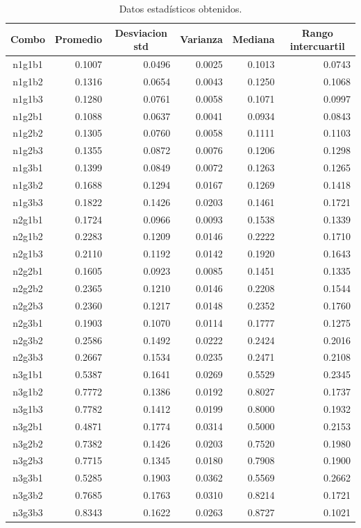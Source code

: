 \documentclass{article}
\begin{document}
\begin{table}[h!]
\centering
\caption{Datos estadísticos obtenidos.}
\label{tabla4}
\begin{tabular}{|c|r|r|r|r|r|}
\hline
\textbf{Combo} & \multicolumn{1}{c|}{\textbf{Promedio}} & \multicolumn{1}{c|}{\textbf{Desviacion std}} & \multicolumn{1}{c|}{\textbf{Varianza}} & \multicolumn{1}{c|}{\textbf{Mediana}} & \multicolumn{1}{c|}{\textbf{Rango intercuartil}} \\ \hline
n1g1b1 & 0.1007 & 0.0496 & 0.0025 & 0.1013 & 0.0743 \\ \hline
n1g1b2 & 0.1316 & 0.0654 & 0.0043 & 0.1250 & 0.1068 \\ \hline
n1g1b3 & 0.1280 & 0.0761 & 0.0058 & 0.1071 & 0.0997 \\ \hline
n1g2b1 & 0.1088 & 0.0637 & 0.0041 & 0.0934 & 0.0843 \\ \hline
n1g2b2 & 0.1305 & 0.0760 & 0.0058 & 0.1111 & 0.1103 \\ \hline
n1g2b3 & 0.1355 & 0.0872 & 0.0076 & 0.1206 & 0.1298 \\ \hline
n1g3b1 & 0.1399 & 0.0849 & 0.0072 & 0.1263 & 0.1265 \\ \hline
n1g3b2 & 0.1688 & 0.1294 & 0.0167 & 0.1269 & 0.1418 \\ \hline
n1g3b3 & 0.1822 & 0.1426 & 0.0203 & 0.1461 & 0.1721 \\ \hline
n2g1b1 & 0.1724 & 0.0966 & 0.0093 & 0.1538 & 0.1339 \\ \hline
n2g1b2 & 0.2283 & 0.1209 & 0.0146 & 0.2222 & 0.1710 \\ \hline
n2g1b3 & 0.2110 & 0.1192 & 0.0142 & 0.1920 & 0.1643 \\ \hline
n2g2b1 & 0.1605 & 0.0923 & 0.0085 & 0.1451 & 0.1335 \\ \hline
n2g2b2 & 0.2365 & 0.1210 & 0.0146 & 0.2208 & 0.1544 \\ \hline
n2g2b3 & 0.2360 & 0.1217 & 0.0148 & 0.2352 & 0.1760 \\ \hline
n2g3b1 & 0.1903 & 0.1070 & 0.0114 & 0.1777 & 0.1275 \\ \hline
n2g3b2 & 0.2586 & 0.1492 & 0.0222 & 0.2424 & 0.2016 \\ \hline
n2g3b3 & 0.2667 & 0.1534 & 0.0235 & 0.2471 & 0.2108 \\ \hline
n3g1b1 & 0.5387 & 0.1641 & 0.0269 & 0.5529 & 0.2345 \\ \hline
n3g1b2 & 0.7772 & 0.1386 & 0.0192 & 0.8027 & 0.1737 \\ \hline
n3g1b3 & 0.7782 & 0.1412 & 0.0199 & 0.8000 & 0.1932 \\ \hline
n3g2b1 & 0.4871 & 0.1774 & 0.0314 & 0.5000 & 0.2153 \\ \hline
n3g2b2 & 0.7382 & 0.1426 & 0.0203 & 0.7520 & 0.1980 \\ \hline
n3g2b3 & 0.7715 & 0.1345 & 0.0180 & 0.7908 & 0.1900 \\ \hline
n3g3b1 & 0.5285 & 0.1903 & 0.0362 & 0.5569 & 0.2662 \\ \hline
n3g3b2 & 0.7685 & 0.1763 & 0.0310 & 0.8214 & 0.1721 \\ \hline
n3g3b3 & 0.8343 & 0.1622 & 0.0263 & 0.8727 & 0.1021 \\ \hline
\end{tabular}
\end{table}
\end{document}
